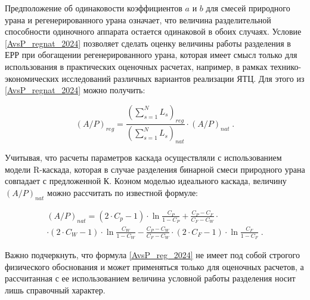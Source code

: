 Предположение об одинаковости коэффициентов $a$ и $b$ для смесей природного урана и регенерированного урана означает, что величина разделительной способности одиночного аппарата остается одинаковой в обоих случаях. Условие \ref{AvsP_regnat_2024} позволяет сделать оценку величины работы разделения в ЕРР при обогащении регенерированного урана, которая имеет смысл только для использования в практических оценочных расчетах, например, в рамках технико-экономических исследований различных вариантов реализации ЯТЦ. Для этого из \ref{AvsP_regnat_2024} можно получить:

\begin{equation}\label{AvsP_reg_2024}
  (A/P)_{reg}=\frac{(\sum_{s=1}^N L_s)_{reg}}{(\sum_{s=1}^N L_s)_{nat}} \cdot (A/P)_{nat} \; .
\end{equation}

Учитывая, что расчеты параметров каскада осуществляли с использованием модели R-каскада, которая в случае разделения бинарной смеси природного урана совпадает с предложенной К. Коэном моделью идеального каскада, величину $(A/P)_{nat}$ можно рассчитать по известной формуле:

\begin{equation}\label{kohen_2024}
  \begin{gathered}
    (A/P)_{nat}=\left(2 \cdot C_p-1\right) \cdot \ln \frac{C_P}{1-C_P}+\frac{C_P-C_F}{C_F-C_W} \cdot \\
    \cdot \left(2 \cdot C_W-1\right) \cdot \ln \frac{C_W}{1-C_W}-\frac{C_P-C_W}{C_F-C_W} \cdot \left(2 \cdot C_F-1\right) \cdot \ln \frac{C_F}{1-C_F} \; .
  \end{gathered}
\end{equation}

Важно подчеркнуть, что формула \ref{AvsP_reg_2024} не имеет под собой строгого физического обоснования и может  применяться только для оценочных расчетов, а рассчитанная с ее использованием величина условной работы разделения носит лишь справочный характер.

  
